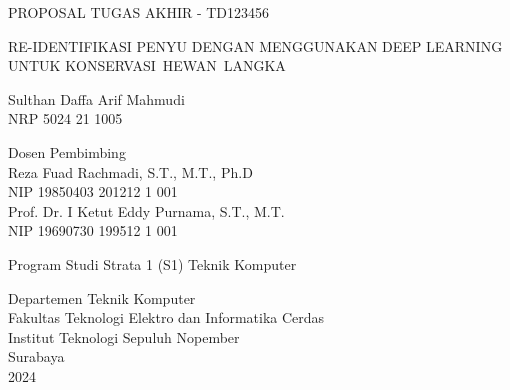\begin{large}
  PROPOSAL TUGAS AKHIR - TD123456
\end{large}

\vspace{\fill}

\begin{spacing}{1.5}
  \begin{Large}
    RE-IDENTIFIKASI PENYU DENGAN MENGGUNAKAN DEEP LEARNING UNTUK KONSERVASI HEWAN LANGKA
  \end{Large}
\end{spacing}

\vspace{\fill}

\begin{large}
  Sulthan Daffa Arif Mahmudi \\
  \textmd{NRP 5024 21 1005}
\end{large}

\vspace{\fill}

\begin{large}
  \textmd{Dosen Pembimbing} \\
  Reza Fuad Rachmadi, S.T., M.T., Ph.D \\
  \textmd{NIP 19850403 201212 1 001} \\
  Prof. Dr. I Ketut Eddy Purnama, S.T., M.T. \\
  \textmd{NIP 19690730 199512 1 001}
\end{large}

\vspace{\fill}

Program Studi Strata 1 (S1) Teknik Komputer \\

\mdseries

Departemen Teknik Komputer \\
Fakultas Teknologi Elektro dan Informatika Cerdas \\
Institut Teknologi Sepuluh Nopember \\

Surabaya \\
2024
